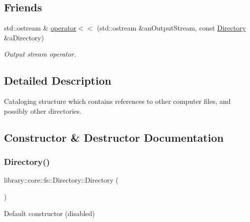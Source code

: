 \subsection*{Friends}
\begin{DoxyCompactItemize}
\item 
std\+::ostream \& \hyperlink{classlibrary_1_1core_1_1fs_1_1_directory_a3cbfede39f82ab145f110ca14e21deef}{operator$<$$<$} (std\+::ostream \&an\+Output\+Stream, const \hyperlink{classlibrary_1_1core_1_1fs_1_1_directory}{Directory} \&a\+Directory)
\begin{DoxyCompactList}\small\item\em Output stream operator. \end{DoxyCompactList}\end{DoxyCompactItemize}


\subsection{Detailed Description}
Cataloging structure which contains references to other computer files, and possibly other directories. 

\subsection{Constructor \& Destructor Documentation}
\mbox{\label{classlibrary_1_1core_1_1fs_1_1_directory_a3ec39f6cad19a81d520e9a1f2d8bb1f7}} 
\subsubsection{\texorpdfstring{Directory()}{Directory()}\hspace{0.1cm}{\footnotesize\ttfamily [1/2]}}
{\footnotesize\ttfamily library\+::core\+::fs\+::\+Directory\+::\+Directory (\begin{DoxyParamCaption}{ }\end{DoxyParamCaption})\hspace{0.3cm}{\ttfamily [delete]}}



Default constructor (disabled) 

\mbox{\label{classlibrary_1_1core_1_1fs_1_1_directory_a5685b48aa8a6332caf0e4e253d8471f7}} 
